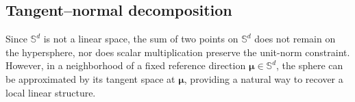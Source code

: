 \documentclass[12pt]{report} %
\newcommand{\bx}{\mathbf{x}}
\newcommand{\bmu}{\boldsymbol{\mu}}
\newcommand{\Sd}{\mathbb{S}^{d}}
\begin{document}

\subsection*{Tangent--normal decomposition}

Since $\Sd$ is not a linear space, the sum of two points on $\Sd$ does not remain on the hypersphere, nor does scalar multiplication preserve the unit-norm constraint. However, in a neighborhood of a fixed reference direction $\bmu\in\Sd$, the sphere can be approximated by its tangent space at $\bmu$,  providing a natural way to recover a local linear structure. 
\end{document}
